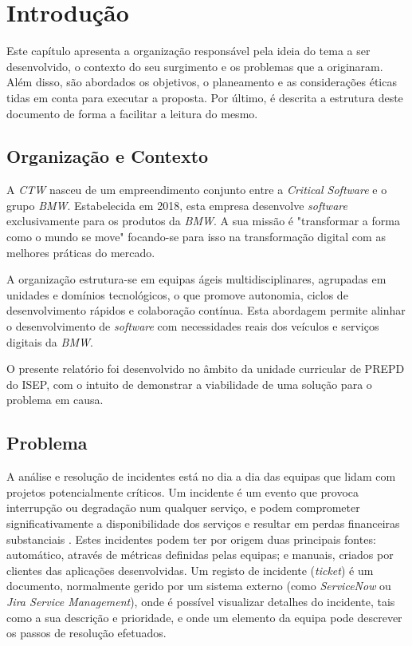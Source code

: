 
\chapter{Introdução} %
\label{chap:Chapter1} %
	Este capítulo apresenta a organização responsável pela ideia do tema a ser desenvolvido, o contexto do seu surgimento e os problemas que a originaram. Além disso, são abordados os objetivos, o planeamento e as considerações éticas tidas em conta para executar a proposta. Por último, é descrita a estrutura deste documento de forma a facilitar a leitura do mesmo.
\section{Organização e Contexto}
	A \textit{\gls{CTW}} nasceu de um empreendimento conjunto entre a \textit{Critical Software} e o grupo \textit{\gls{BMW}}. Estabelecida em 2018, esta empresa desenvolve \textit{software} exclusivamente para os produtos da \textit{\gls{BMW}}. A sua missão é "transformar a forma como o mundo se move" focando-se para isso na transformação digital com as melhores práticas do mercado.
	
	A organização estrutura-se em equipas ágeis multidisciplinares, agrupadas em unidades e domínios tecnológicos, o que promove autonomia, ciclos de desenvolvimento rápidos e colaboração contínua. Esta abordagem permite alinhar o desenvolvimento de \textit{software} com necessidades reais dos veículos e serviços digitais da \textit{\gls{BMW}}.
	
	O presente relatório foi desenvolvido no âmbito da unidade curricular de \gls{PREPD} do \gls{ISEP}, com o intuito de demonstrar a viabilidade de uma solução para o problema em causa.

\section{Problema}
	A análise e resolução de incidentes está no dia a dia das equipas que lidam com projetos potencialmente críticos. Um incidente é um evento que provoca interrupção ou degradação num qualquer serviço, e podem comprometer significativamente a disponibilidade dos serviços e resultar em perdas financeiras substanciais \autocite{Reference2}. Estes incidentes podem ter por origem duas principais fontes: automático, através de métricas definidas pelas equipas; e manuais, criados por clientes das aplicações desenvolvidas. Um registo de incidente (\textit{ticket}) é um documento, normalmente gerido por um sistema externo (como \textit{ServiceNow} ou \textit{Jira Service Management}), onde é possível visualizar detalhes do incidente, tais como a sua descrição e prioridade, e onde um elemento da equipa pode descrever os passos de resolução efetuados.
	
